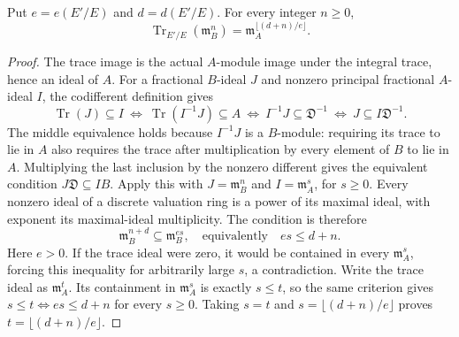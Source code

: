 \begin{lemma}
\label{fw:trace-ideal}
\leanok
Put $e=e(E'/E)$ and $d=d(E'/E)$. For every integer $n\geq0$,
\[
 \operatorname{Tr}_{E'/E}(\mathfrak m_B^n)
       =\mathfrak m_A^{\lfloor(d+n)/e\rfloor}.
\]
\end{lemma}
\begin{proof}
The trace image is the actual $A$-module image under the integral
trace, hence an ideal of $A$. For a fractional $B$-ideal $J$ and
nonzero principal fractional $A$-ideal $I$,
the codifferent definition gives
\[
 \operatorname{Tr}(J)\subseteq I
 \ \Longleftrightarrow\
 \operatorname{Tr}(I^{-1}J)\subseteq A
 \ \Longleftrightarrow\
 I^{-1}J\subseteq\mathfrak D^{-1}
 \ \Longleftrightarrow\
 J\subseteq I\mathfrak D^{-1}.
\]
The middle equivalence holds because $I^{-1}J$ is a $B$-module:
requiring its trace to lie in $A$ also requires the trace after
multiplication by every element of $B$ to lie in $A$.
Multiplying the last inclusion by the nonzero different gives the
equivalent condition $J\mathfrak D\subseteq IB$. Apply this with
$J=\mathfrak m_B^n$ and $I=\mathfrak m_A^s$, for $s\geq0$.
Every nonzero ideal of a discrete valuation ring is a power of its
maximal ideal, with exponent its maximal-ideal multiplicity. The
condition is therefore
\[
 \mathfrak m_B^{n+d}\subseteq\mathfrak m_B^{es},
 \quad\text{equivalently}\quad es\leq d+n.
\]
Here $e>0$. If the trace ideal were zero, it would be contained in
every $\mathfrak m_A^s$, forcing this inequality for arbitrarily
large $s$, a contradiction. Write the trace ideal as
$\mathfrak m_A^t$. Its containment in $\mathfrak m_A^s$ is exactly
$s\leq t$, so the same criterion gives
$s\leq t\Longleftrightarrow es\leq d+n$ for every $s\geq0$.
Taking $s=t$ and $s=\lfloor(d+n)/e\rfloor$ proves
$t=\lfloor(d+n)/e\rfloor$.
\end{proof}
